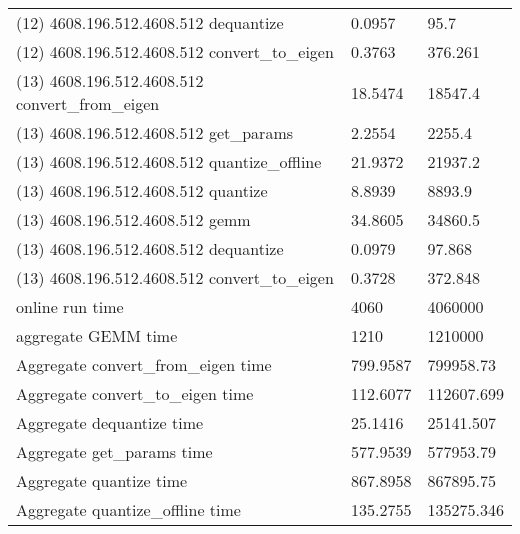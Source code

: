 \begin{longtable}{lll}
(12) 4608.196.512.4608.512 dequantize            & 0.0957         & 95.7             \\
(12) 4608.196.512.4608.512 convert\_to\_eigen    & 0.3763         & 376.261          \\
(13) 4608.196.512.4608.512 convert\_from\_eigen  & 18.5474        & 18547.4          \\
(13) 4608.196.512.4608.512 get\_params           & 2.2554         & 2255.4           \\
(13) 4608.196.512.4608.512 quantize\_offline     & 21.9372        & 21937.2          \\
(13) 4608.196.512.4608.512 quantize              & 8.8939         & 8893.9           \\
(13) 4608.196.512.4608.512 gemm                  & 34.8605        & 34860.5          \\
(13) 4608.196.512.4608.512 dequantize            & 0.0979         & 97.868           \\
(13) 4608.196.512.4608.512 convert\_to\_eigen    & 0.3728         & 372.848          \\
online run time                                  & 4060           & 4060000          \\
aggregate GEMM time                              & 1210           & 1210000          \\
Aggregate convert\_from\_eigen time              & 799.9587       & 799958.73        \\
Aggregate convert\_to\_eigen time                & 112.6077       & 112607.699       \\
Aggregate dequantize time                        & 25.1416        & 25141.507        \\
Aggregate get\_params time                       & 577.9539       & 577953.79        \\
Aggregate quantize time                          & 867.8958       & 867895.75        \\
Aggregate quantize\_offline time                 & 135.2755       & 135275.346      
\end{longtable}

